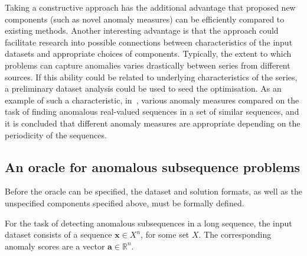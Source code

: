 Taking a constructive approach has the additional advantage that proposed new components (such as novel anomaly measures) can be efficiently compared to existing methods. Another interesting advantage is that the approach could facilitate research into possible connections between characteristics of the input datasets and appropriate choices of components. Typically, the extent to which problems can capture anomalies varies drastically between series from different sources. If this ability could be related to underlying characteristics of the series, a preliminary dataset analysis could be used to seed the optimisation. As an example of such a characteristic, in~\cite{chandola3}, various anomaly measures compared on the task of finding anomalous real-valued sequences in a set of similar sequences, and it is concluded that different anomaly measures are appropriate depending on the periodicity of the sequences.

\subsection{An oracle for anomalous subsequence problems}
\label{sect:subsequence_oracle}

Before the oracle can be specified, the dataset and solution formats, as well as the unspecified components specified above, must be formally defined.

For the task of detecting anomalous subsequences in a long sequence, the input dataset consists of a sequence $\mathbf{x} \in X^n$, for some set $X$. The corresponding anomaly scores are a vector $\mathbf{a} \in \mathbb{R}^n$.

